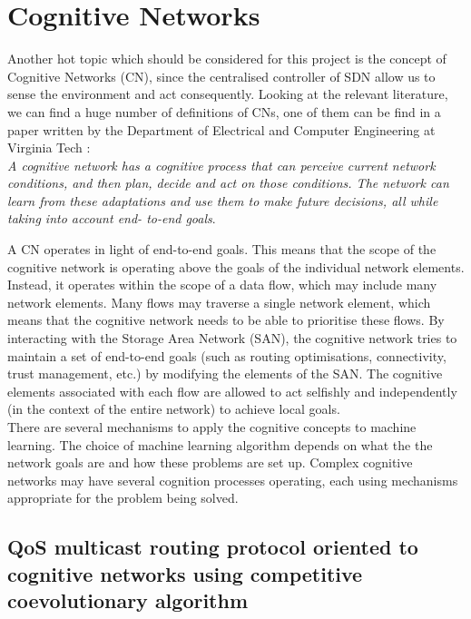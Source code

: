 \section{Cognitive Networks}

Another hot topic which should be considered for this project is the concept of Cognitive Networks (CN), since the centralised controller of SDN allow us to sense the environment and act consequently. Looking at the relevant literature, we can find a huge number of definitions of CNs, one of them can be find in a paper written by the Department of Electrical and Computer Engineering at Virginia Tech \cite{cognet-virginia}:\\

\emph{A cognitive network has a cognitive process that can perceive current network conditions, and then plan, decide and act on those conditions. The network can learn from these adaptations and use them to make future decisions, all while taking into account end- to-end goals}.\\


A CN operates in light of end-to-end goals. This means that the scope of the cognitive network is operating above the goals of the individual network elements. Instead, it operates within the scope of a data flow, which may include many network elements. Many flows may traverse a single network element, which means that the cognitive network needs to be able to prioritise these flows. By interacting with the Storage Area Network (SAN), the cognitive network tries to maintain a set of end-to-end goals (such as routing optimisations, connectivity, trust management, etc.) by modifying the elements of the SAN. The cognitive elements associated with each flow are allowed to act selfishly and independently (in the context of the entire network) to achieve local goals.\\

There are several mechanisms to apply the cognitive concepts to machine learning. The choice of machine learning algorithm depends on what the the network goals are and how these problems are set up. Complex cognitive networks may have several cognition processes operating, each using mechanisms appropriate for the problem being solved.\\


\subsection{QoS multicast routing protocol oriented to cognitive networks using competitive coevolutionary algorithm}
\label{sec:cogMRT}

